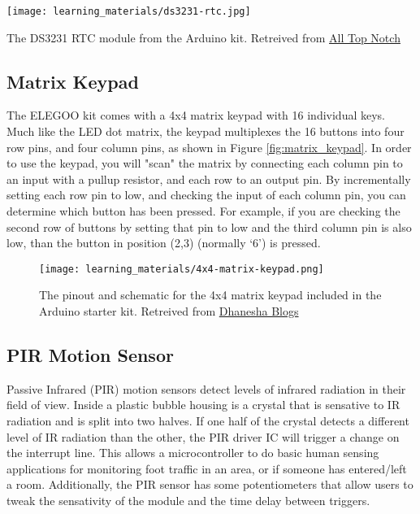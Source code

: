     \begin{marginfigure}[-2in]
        \texttt{[image: learning\_materials/ds3231-rtc.jpg]}
        \caption[DS3231 RTC Module]{The DS3231 RTC module from the Arduino kit. 
        Retreived from \href{https://alltopnotch.co.uk/wp-content/uploads/imported/9/RTC-Real-Time-Clock-DS3231-I2C-AT24C32-Board-Module-Arduino-ARM-PIC-UK-Seller-361515587149-4.JPG}
        {All Top Notch}}
    \end{marginfigure}

    \subsection*{Matrix Keypad}
    The ELEGOO kit comes with a 4x4 matrix keypad with 16 individual keys.
    Much like the LED dot matrix, the keypad multiplexes the 16 buttons into four row pins, and four column pins, as shown in Figure \ref{fig:matrix_keypad}.
    In order to use the keypad, you will "scan" the matrix by connecting each column pin to an input with a pullup resistor, and each row to an output pin.
    By incrementally setting each row pin to low, and checking the input of each column pin, you can determine which button has been pressed.
    For example, if you are checking the second row of buttons by setting that pin to low and the third column pin is also low, than the button in position (2,3) (normally `6') is pressed.

    \begin{figure}[h!]
        \texttt{[image: learning\_materials/4x4-matrix-keypad.png]}
        \caption[4x4 Matrix Keypad]{The pinout and schematic for the 4x4 matrix keypad included in the Arduino starter kit. 
        Retreived from \href{https://dhaneshablogs.blogspot.com/2019/08/interfacing-4x4-matrix-keypad-with.html}
        {Dhanesha Blogs}}
    \end{figure}

    \subsection*{PIR Motion Sensor}
    Passive Infrared (PIR) motion sensors detect levels of infrared radiation in their field of view.
    Inside a plastic bubble housing is a crystal that is sensative to IR radiation and is split into two halves.
    If one half of the crystal detects a different level of IR radiation than the other, the PIR driver IC will trigger a change on the interrupt line.
    This allows a microcontroller to do basic human sensing applications for monitoring foot traffic in an area, or if someone has entered/left a room.
    Additionally, the PIR sensor has some potentiometers that allow users to tweak the sensativity of the module and the time delay between triggers.

